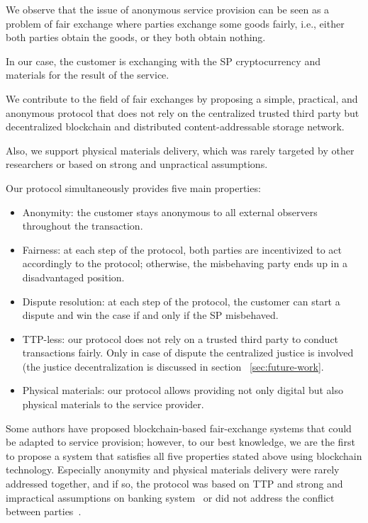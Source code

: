 \documentclass{ieeeaccess}
\begin{document}
We observe that the issue of anonymous service provision can be seen as a problem of fair exchange where parties exchange some goods fairly, i.e., either both parties obtain the goods, or they both obtain nothing.

In our case, the customer is exchanging with the SP cryptocurrency and materials for the result of the service.

We contribute to the field of fair exchanges by proposing a simple, practical, and anonymous protocol that does not rely on the centralized trusted third party but decentralized blockchain and
distributed content-addressable storage network.

Also, we support physical materials delivery, which was rarely targeted by other researchers or based on strong and unpractical assumptions.

Our protocol simultaneously provides five main properties:

\begin{itemize}
\item Anonymity: the customer stays anonymous to all external observers throughout the transaction.
\item Fairness:
at each step of the protocol, both parties are incentivized to act accordingly to the protocol; otherwise, the misbehaving party ends up in a disadvantaged position.
\item Dispute resolution: at each step of the protocol, the customer can start a dispute and win the case if and only if the SP misbehaved.

\item TTP-less: 
our protocol does not rely on a trusted third party to conduct transactions fairly. Only in case of dispute the centralized justice is involved (the justice decentralization is discussed in section ~\ref{sec:future-work}.
\item Physical materials: our protocol allows providing not only digital but also physical materials to the service provider.
\end{itemize} 

Some authors have proposed blockchain-based fair-exchange systems that could be adapted to service provision; however, to our best knowledge, we are the first to propose a system that satisfies all five properties stated above using blockchain technology. Especially anonymity and physical materials delivery were rarely addressed together, and if so, the protocol was based on TTP and strong and impractical assumptions on banking system~\cite{birjoveanu2015anonymity} or did not address the conflict
between parties~\cite{altawy2017lelantos}.
\end{document}
